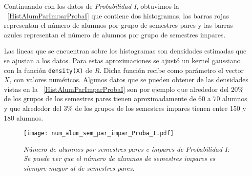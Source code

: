 Continuando con los datos de \textit{Probabilidad I}, obtuvimos la \figurename{~\ref{HistAlumParImparProbaI}} que contiene dos histogramas, las barras rojas representan el número de alumnos por grupo de semestres pares y las barras azules representan el número de alumnos por grupo de semestres impares.


Las líneas que se encuentran sobre los histogramas son densidades estimadas que se ajustan a los datos. Para estas aproximaciones se ajustó un kernel gaussiano con la función \verb+density(X)+ de \textit{R}. Dicha función recibe como parámetro el vector $X$, con valores numéricos. Algunos datos que se pueden obtener de las densidades vistas en la \figurename{~\ref{HistAlumParImparProbaI}} son por ejemplo que alrededor del $20\%$ de los grupos de los semestres pares tienen aproximadamente de $60$ a $70$ alumnos y que alrededor del $3\%$ de los grupos de los semestres impares tienen entre 150 y 180 alumnos. %

\begin{figure}[H]
\centering
\texttt{[image: num\_alum\_sem\_par\_impar\_Proba\_I.pdf]} %
\caption[\textit{Número de alumnos por semestres pares e impares: Probabilidad I}]{\textit{Número de alumnos por semestres pares e impares de Probabilidad I: Se puede ver que el número de alumnos de semestres impares es siempre mayor al de semestres pares.}}\label{ParImparProbaI}%
\end{figure}

